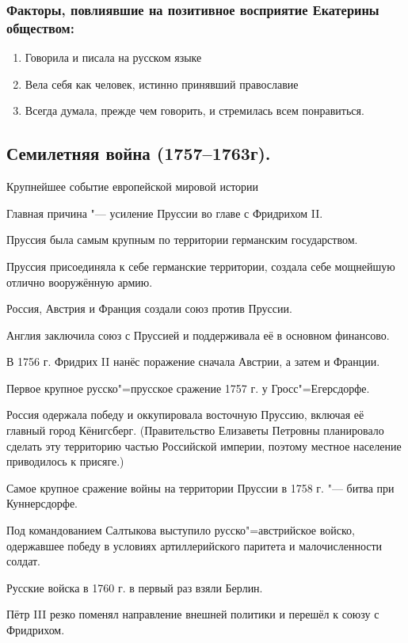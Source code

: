 \subsubsection{Факторы, повлиявшие на позитивное восприятие Екатерины обществом:}

\begin{enumerate}
    \item{ Говорила и писала на русском языке}
    \item{ Вела себя как человек, истинно принявший православие}
    \item{ Всегда думала, прежде чем говорить, и стремилась всем понравиться.}
\end{enumerate}

\subsection{Семилетняя война (1757--1763г).}

Крупнейшее событие европейской мировой истории

Главная причина "--- усиление Пруссии во главе с Фридрихом II. 

Пруссия была самым крупным по территории германским государством. 

Пруссия присоединяла к себе германские территории, создала себе мощнейшую отлично вооружённую армию.

Россия, Австрия и Франция создали союз против Пруссии. 

Англия заключила союз с Пруссией и поддерживала её в основном финансово. 

В 1756 г. Фридрих II нанёс поражение сначала Австрии, а затем и Франции. 

Первое крупное русско"=прусское сражение 1757 г. у Гросс"=Егерсдорфе.

Россия одержала победу и оккупировала восточную Пруссию, включая её главный город Кёнигсберг. (Правительство Елизаветы Петровны планировало сделать эту территорию частью Российской империи, поэтому местное население приводилось к присяге.)

Самое крупное сражение войны на территории Пруссии в 1758 г. "--- битва при Куннерсдорфе. 

Под командованием Салтыкова выступило русско"=австрийское войско, одержавшее победу в условиях артиллерийского паритета и малочисленности солдат. 

Русские войска в 1760 г. в первый раз взяли Берлин. 

Пётр III резко поменял направление внешней политики и перешёл к союзу с Фридрихом. 

